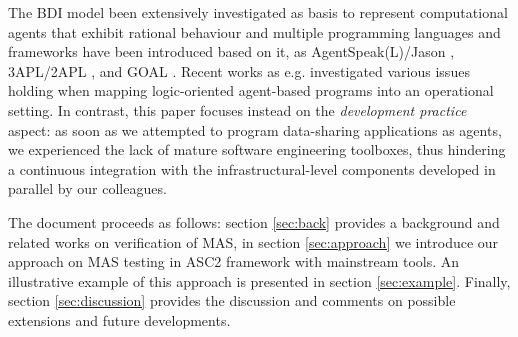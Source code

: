 The BDI model been extensively investigated as basis to represent computational agents that exhibit rational behaviour \cite{Herzig2017} and multiple programming languages and frameworks have been introduced based on it, as AgentSpeak(L)/Jason \cite{RaoAS1996,Bordini2005}, 3APL/2APL \cite{Dastani2APL}, and GOAL \cite{Hindriks2009a}.
Recent works as e.g. \cite{Kampik2020,MohajeriParizi2020} investigated various issues holding when mapping logic-oriented agent-based programs into an operational setting. In contrast, this paper focuses instead on the \textit{development practice} aspect: as soon as we attempted to program data-sharing applications as agents, we experienced the lack of  mature software engineering toolboxes, thus hindering a continuous integration with the infrastructural-level components developed in parallel by our colleagues.


The document proceeds as follows: section \ref{sec:back} provides a background and related works on verification of MAS, in section \ref{sec:approach} we introduce our approach on MAS testing in ASC2 framework with mainstream tools. An illustrative example of this approach is presented in section \ref{sec:example}. Finally, section \ref{sec:discussion} provides the discussion and comments on possible extensions and future developments.




